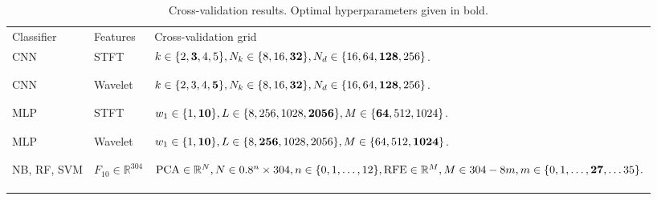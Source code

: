 \documentclass[10pt, twocolumn]{llncs}
\begin{document}
\begin{table}[t]
\centering
\caption{Cross-validation results. Optimal hyperparameters given in bold.}
\label{tab:xval}
\begin{tabular}{lll}
\hline\noalign{\smallskip}
Classifier & Features  & Cross-validation grid         \\ 
\noalign{\smallskip}
\hline
\noalign{\smallskip}
 CNN          & STFT   & \multirow{2}{*}{\parbox{4cm}{$k \in \{2,\mathbf{3},4,5\}, \\ N_k \in \{8,16,\mathbf{32}\},\\  N_d \in \{16,64,\mathbf{128},256\}$. }}\\ \\ \\
 \hline
CNN          & Wavelet & \multirow{2}{*}{\parbox{4cm}{$k \in \{2,3,4,\mathbf{5}\},\\ N_k \in \{8,16,\mathbf{32}\}, \\ N_d \in \{16,64,\mathbf{128},256\}$.}}\\ \\ \\ 
\hline
MLP          & STFT   & \multirow{2}{*}{\parbox{4cm}{$ w_1 \in \{1,\mathbf{10}\},\\ L \in \{8, 256, 1028, \mathbf{2056}\}, \\ M \in \{\mathbf{64}, 512, 1024\} $.}} \\ \\ \\
\hline
MLP          & Wavelet & \multirow{2}{*}{\parbox{4cm}{$w_1 \in \{1,\mathbf{10}\},\\ L \in \{8, \mathbf{256}, 1028, 2056\}, \\ M \in \{64, 512, \mathbf{1024}\} $.}} \\ \\ \\ 
\hline
\noalign{\smallskip}
NB, RF, SVM          & $F_{10}  \in \mathbb{R}^{304} $  & \multirow{2}{*}{\parbox{4cm}{$ \text{PCA} \in \mathbb{R}^{N}, N \in 0.8^n \times 304,\\ n \in \{0,1,\ldots,12\}, \\ \text{RFE} \in \mathbb{R}^{M}, M \in 304 - 8m, \\ m \in \{0, 1, \ldots, \mathbf{27}, \ldots  35\}.  $}}\\ \\ \\  \\

\hline
\end{tabular}
\end{table}
\end{document}
